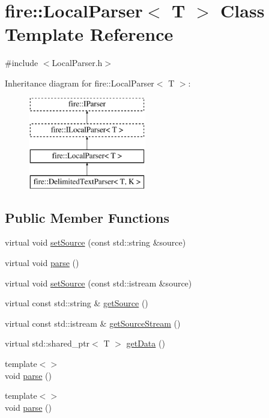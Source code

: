 \hypertarget{a00029}{}\section{fire\+:\+:Local\+Parser$<$ T $>$ Class Template Reference}
\label{a00029}


{\ttfamily \#include $<$Local\+Parser.\+h$>$}

Inheritance diagram for fire\+:\+:Local\+Parser$<$ T $>$\+:\begin{figure}[H]
\begin{center}
\leavevmode
\includegraphics[height=4.000000cm]{a00029}
\end{center}
\end{figure}
\subsection*{Public Member Functions}
\begin{DoxyCompactItemize}
\item 
virtual void \hyperlink{a00029_afcaec6429fdd6e5d53642a32c001ff73}{set\+Source} (const std\+::string \&source)
\item 
virtual void \hyperlink{a00029_abd8929aea06c2dda40256d2e58236650}{parse} ()
\item 
virtual void \hyperlink{a00029_aed4357541f2ff7d46f8846bd07bb3c42}{set\+Source} (const std\+::istream \&source)
\item 
virtual const std\+::string \& \hyperlink{a00029_aedb7fe10911182525a719963b9b56726}{get\+Source} ()
\item 
virtual const std\+::istream \& \hyperlink{a00029_a9bf19a3cc9ae8ac0e6e7a0e7f6212cdc}{get\+Source\+Stream} ()
\item 
virtual std\+::shared\+\_\+ptr$<$ T $>$ \hyperlink{a00029_ab9016cca8e5dca516bb57c6a8e76607a}{get\+Data} ()
\item 
{\footnotesize template$<$$>$ }\\void \hyperlink{a00029_a34fd9ffb0196c612c75b5288ed5e219b}{parse} ()
\item 
{\footnotesize template$<$$>$ }\\void \hyperlink{a00029_ae904e264fe16708b3e434adea59e1b88}{parse} ()
\end{DoxyCompactItemize}
